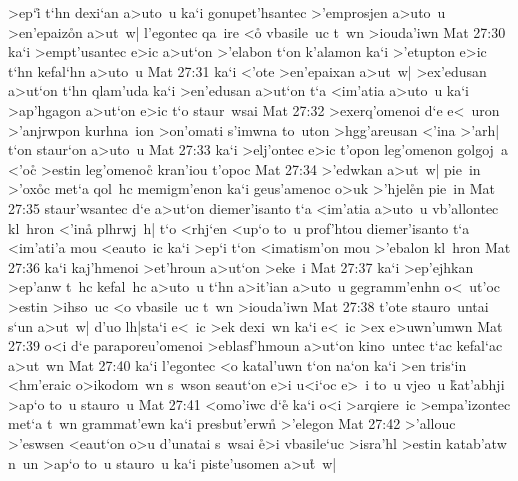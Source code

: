 >ep`i\r{}
t`hn
dexi`an
a>uto~u
ka`i
gonupet'hsantec
>'emprosjen
a>uto~u
>en'epaiz\r{o}n
a>ut~w|
l'egontec
qa~ire
<o\r{}
vbasile~uc
t~wn
>iouda'iwn\bibvsend
\vs Mat 27:30
ka`i
>empt'usantec
e>ic
a>ut`on
>'elabon
t`on
k'alamon
ka`i
>'etupton
e>ic
t`hn
kefal`hn
a>uto~u\bibvsend
\vs Mat 27:31
ka`i
<'ote
>en'epaixan
a>ut~w|
>ex'edusan
a>ut`on
t`hn
qlam'uda
ka`i
>en'edusan
a>ut`on
t`a
<im'atia
a>uto~u
ka`i
>ap'hgagon
a>ut`on
e>ic
t`o
staur~wsai\bibvsend
\vs Mat 27:32
>exerq'omenoi
d`e
e<~uron
>'anjrwpon
kurhna~ion
>on'omati
s'imwna
to~uton
>hgg'areusan
<'ina
>'arh|
t`on
staur`on
a>uto~u\bibvsend
\vs Mat 27:33
ka`i
>elj'ontec
e>ic
t'opon
leg'omenon
golgoj~a
<'o\r{c}
>estin
leg'omenoc\r{}
kran'iou
t'opoc\bibvsend
\vs Mat 27:34
>'edwkan
a>ut~w|
pie~in
>'ox\r{o}c
met`a
qol~hc
memigm'enon
ka`i
geus'amenoc
o>uk
>'hjel\r{e}n
pie~in\bibvsend
\vs Mat 27:35
staur'wsantec
d`e
a>ut`on
diemer'isanto
t`a
<im'atia
a>uto~u
vb'allontec
kl~hron
<'ina\r{}
plhrwj~h|
t`o
<rhj`en
<up`o
to~u
prof'htou
diemer'isanto
t`a
<im'ati'a
mou
<eauto~ic
ka`i
>ep`i
t`on
<imatism'on
mou
>'ebalon
kl~hron\bibvsend
\vs Mat 27:36
ka`i
kaj'hmenoi
>et'hroun
a>ut`on
>eke~i\bibvsend
\vs Mat 27:37
ka`i
>ep'ejhkan
>ep'anw
t~hc
kefal~hc
a>uto~u
t`hn
a>it'ian
a>uto~u
gegramm'enhn
o<~ut'oc
>estin
>ihso~uc
<o
vbasile~uc
t~wn
>iouda'iwn\bibvsend
\vs Mat 27:38
t'ote
stauro~untai
s`un
a>ut~w|
d'uo
lh|sta`i
e<~ic
>ek
dexi~wn
ka`i
e<~ic
>ex
e>uwn'umwn\bibvsend
\vs Mat 27:39
o<i
d`e
paraporeu'omenoi
>eblasf'hmoun
a>ut`on
kino~untec
t`ac
kefal`ac
a>ut~wn\bibvsend
\vs Mat 27:40
ka`i
l'egontec
<o
katal'uwn
t`on
na`on
ka`i
>en
tris`in
<hm'eraic
o>ikodom~wn
s~wson
seaut`on
e>i
u<i`oc
e>~i
to~u
vjeo~u
\r{k}at'abhji
>ap`o
to~u
stauro~u\bibvsend
\vs Mat 27:41
<omo'iwc
d`e\r{}
ka`i
o<i
>arqiere~ic
>empa'izontec
met`a
t~wn
grammat'ewn
ka`i
presbut'erw\r{n}
>'elegon\bibvsend
\vs Mat 27:42
>'allouc
>'eswsen
<eaut`on
o>u
d'unatai
s~wsai
\r{e}>i
vbasile`uc
>isra'hl
>estin
katab'atw
n~un
>ap`o
to~u
stauro~u
ka`i
piste'usomen
a>u\r{t}~w|\bibvsend
